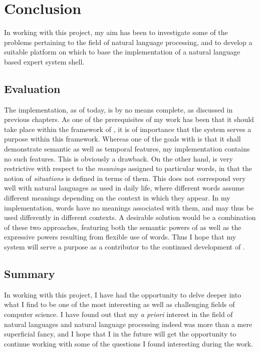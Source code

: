 
\chapter{Conclusion}
\label{concl}

In working with this project, my aim has been to investigate some of
the problems pertaining to the field of natural language processing,
and to develop a suitable platform on which to base the implementation
of a natural language based expert system shell. 

\section{Evaluation}

The implementation, as of today, is by no means complete, as discussed
in previous chapters. As one of the prerequisites of my work has been
that it should take place within the framework of {\tuc}, it is of
importance that the system serves a purpose within this framework.
Whereas one of the goals with {\tuc} is that it shall demonstrate
semantic as well as temporal features, my implementation contains no
such features. This is obviously a drawback. On the other hand, {\tuc}
is very restrictive with respect to the {\em meanings\/} assigned to
particular words, in that the notion of {\em situations\/} is defined
in terms of them. This does not correspond very well with natural
languages as used in daily life, where different words assume
different meanings depending on the context in which they appear. In
my implementation, words have no meanings associated with them, and
may thus be used differently in different contexts. A desirable
solution would be a combination of these two approaches, featuring
both the semantic powers of {\tuc} as well as the expressive powers
resulting from flexible use of words. Thus I hope that my system will
serve a purpose as a contributor to the continued development of
{\tuc}.

\section{Summary}

In working with this project, I have had the opportunity to delve
deeper into what I find to be one of the most interesting as well as
challenging fields of computer science. I have found out that my {\em
a priori\/} interest in the field of natural languages and natural
language processing indeed was more than a mere superficial fancy, and
I hope that I in the future will get the opportunity to continue
working with some of the questions I found interesting during the
work.
